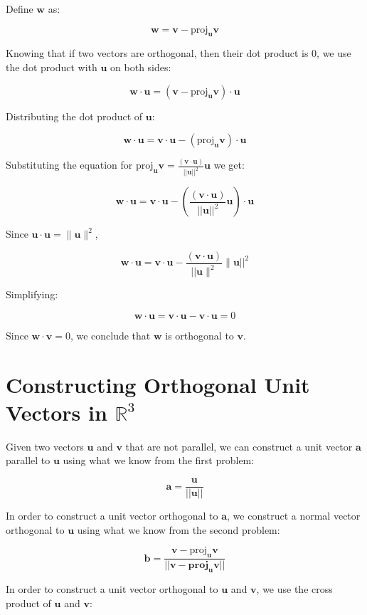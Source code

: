 \documentclass{article}
\newcommand{\R}{\ensuremath{\mathbb{R}}}
\newcommand{\mbf}[1]{\mathbf{#1}}
\newcommand{\magn}[1]{||\mbf{#1}||}
\begin{document}
Define \(\mbf{w}\) as:

\[
 \mbf{w} = \mbf{v} - \text{proj}_{\mbf{u}} \mbf{v}
\]

Knowing that if two vectors are orthogonal, then their dot product is 0, we use the dot product with \(\mbf{u}\) on both sides:

\[
 \mbf{w} \cdot \mbf{u} = (\mbf{v} - \text{proj}_{\mbf{u}} \mbf{v}) \cdot \mbf{u}
\]

Distributing the dot product of \(\mbf{u}\):

\[
 \mbf{w} \cdot \mbf{u} = \mbf{v} \cdot \mbf{u} - (\text{proj}_{\mbf{u}} \mbf{v}) \cdot \mbf{u}
\]

Substituting the equation for \(\text{proj}_{\mbf{u}} \mbf{v} = \frac{(\mbf{v} \cdot \mbf{u})}{||\mbf{u}||^2} \mbf{u}\) we get:

\[
 \mbf{w} \cdot \mbf{u} = \mbf{v} \cdot \mbf{u} - \left( \frac{(\mbf{v} \cdot \mbf{u})}{||\mbf{u}||^2} \mbf{u} \right) \cdot \mbf{u}
\]

Since \(\mbf{u} \cdot \mbf{u} = \| \mbf{u} \|^2\),

\[
 \mbf{w} \cdot \mbf{u} = \mbf{v} \cdot \mbf{u} - \frac{(\mbf{v} \cdot \mbf{u})}{||\mbf{u}\| ^2}  \|\mbf{u}||^2
\]

Simplifying:

\[
 \mbf{w} \cdot \mbf{u} = \mbf{v} \cdot \mbf{u} - \mbf{v} \cdot \mbf{u} = 0
\]

Since \(\mbf{w} \cdot \mbf{v} = 0\), we conclude that \(\mbf{w}\) is orthogonal to \(\mbf{v}\).

\section{Constructing Orthogonal Unit Vectors in $\R^3$}

Given two vectors \(\mbf{u}\) and \(\mbf{v}\) that are not parallel, we can construct a unit vector \(\mbf{a}\) parallel to \(\mbf{u}\) using what we know from the first problem:

\[
 \mbf{a} = \frac{\mbf{u}}{\magn{u}}
\]

In order to construct a unit vector orthogonal to \(\mbf{a}\), we construct a normal vector orthogonal to \(\mbf{u}\) using what we know from the second problem:

\[
 \mbf{b} = \frac{\mbf{v} - \text{proj}_{\mbf{u}} \mbf{v}}{\magn{\mbf{v} - \text{proj}_{\mbf{u}} \mbf{v}}}
\]

In order to construct a unit vector orthogonal to \(\mbf{u}\) and \(\mbf{v}\), we use the cross product of \(\mbf{u}\) and \(\mbf{v}\):
\end{document}
